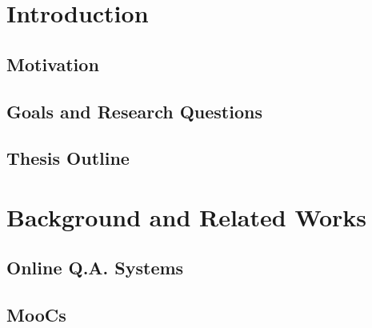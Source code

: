 \documentclass[english, BCOR=6mm, twoside=true, open=right]{tudscrreprt}
\begin{document}

\maketitle




\confirmation[pagestyle=empty.tudheadings]
\cleardoublepage


\begin{abstract}[pagestyle=empty.tudheadings]

\end{abstract}

\tableofcontents

\chapter{Introduction}

\section{Motivation}

\section{Goals and Research Questions}

\section{Thesis Outline}



\chapter{Background and Related Works}
% 
\section{Online Q.A. Systems}
% 
\section{MooCs}
% 


\end{document}
